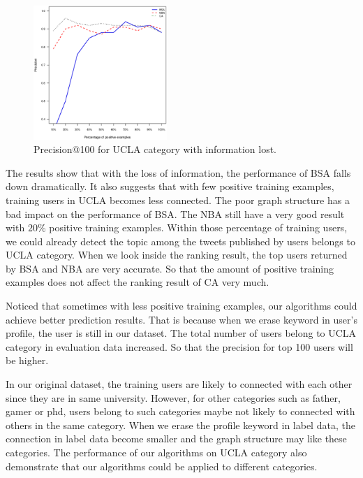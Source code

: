 \documentclass{article}
\begin{document}
\begin{figure}[h]
\centering
\includegraphics[width=0.45\textwidth]{experiment/e2.ucla.eps}
\caption{Precision@100 for UCLA category with information lost.}
\label{fig:e3}
\end{figure}

The results show that with the loss of information, the performance of BSA falls down dramatically. It also suggests that with few positive training examples, training users in UCLA becomes less connected. The poor graph structure has a bad impact on the performance of BSA.
The NBA still have a very good result with $20\%$ positive training examples. Within those percentage of training users, we could already detect the topic among the tweets published by users belongs to UCLA category. When we look inside the ranking result, the top users returned by BSA and NBA are very accurate. So that the amount of positive training examples does not affect the ranking result of CA very much.

Noticed that sometimes with less positive training examples, our algorithms could achieve better prediction results. That is because when we erase keyword in user's profile, the user is still in our dataset. The total number of users belong to UCLA category in evaluation data increased. So that the precision for top 100 users will be higher.

In our original dataset, the training users are likely to connected with each other since they are in same university. However, for other categories such as father, gamer or phd, users belong to such categories maybe not likely to connected with others in the same category. When we erase the profile keyword in label data, the connection in label data become smaller and the graph structure may like these categories. The performance of our algorithms on UCLA category also demonstrate that our algorithms could be applied to different categories.

\ifx \allfiles \undefined
\end{document}
